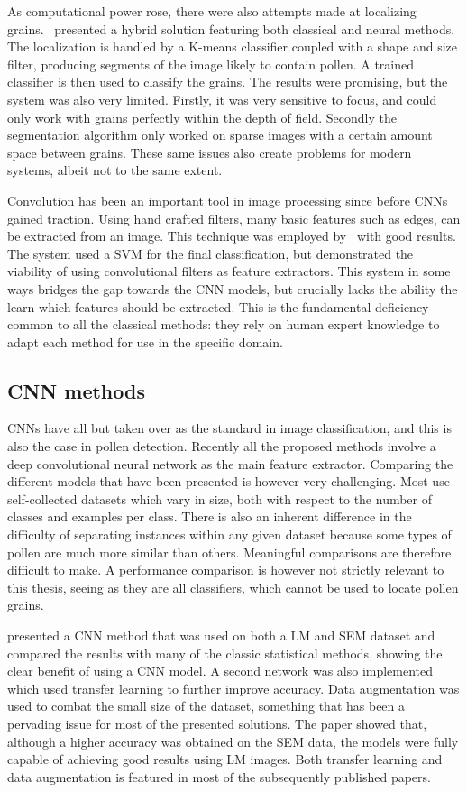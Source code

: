 As computational power rose, there were also attempts made at localizing grains.\ \cite{france_new_2000} presented a hybrid solution featuring both classical and neural methods.
The localization is handled by a K-means classifier coupled with a shape and size filter, producing segments of the image likely to contain pollen.
A trained classifier is then used to classify the grains.
The results were promising, but the system was also very limited.
Firstly, it was very sensitive to focus, and could only work with grains perfectly within the depth of field.
Secondly the segmentation algorithm only worked on sparse images with a certain amount space between grains.
These same issues also create problems for modern systems, albeit not to the same extent.

Convolution has been an important tool in image processing since before CNNs gained traction.
Using hand crafted filters, many basic features such as edges, can be extracted from an image.
This technique was employed by\ \textcite{DaoodICPR16b} with good results.
The system used a SVM for the final classification, but demonstrated the viability of using convolutional filters as feature extractors.
This system in some ways bridges the gap towards the CNN models, but crucially lacks the ability the learn which features should be extracted.
This is the fundamental deficiency common to all the classical methods: they rely on human expert knowledge to adapt each method for use in the specific domain.

\subsection{CNN methods}
CNNs have all but taken over as the standard in image classification, and this is also the case in pollen detection.
Recently all the proposed methods involve a deep convolutional neural network as the main feature extractor.
Comparing the different models that have been presented is however very challenging.
Most use self-collected datasets which vary in size, both with respect to the number of classes and examples per class.
There is also an inherent difference in the difficulty of separating instances within any given dataset because some types of pollen are much more similar than others.
Meaningful comparisons are therefore difficult to make.
A performance comparison is however not strictly relevant to this thesis, seeing as they are all classifiers, which cannot be used to locate pollen grains.

{\cite{daood_pollen_2016}} presented a CNN method that was used on both a LM and SEM dataset and compared the results with many of the classic statistical methods, showing the clear benefit of using a CNN model.
A second network was also implemented which used transfer learning to further improve accuracy.
Data augmentation was used to combat the small size of the dataset, something that has been a pervading issue for most of the presented solutions.
The paper showed that, although a higher accuracy was obtained on the SEM data, the models were fully capable of achieving good results using LM images.
Both transfer learning and data augmentation is featured in most of the subsequently published papers.

